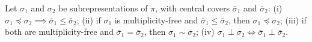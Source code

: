 Let $\sigma_1$ and $\sigma_2$ be subrepresentations of $\pi$, with central covers $\bar{\sigma}_1$ and $\bar{\sigma}_2$: (i) $\sigma_1 \preceq \sigma_2 \implies \bar{\sigma}_1 \leqslant \bar{\sigma}_2$; (ii) if $\sigma_1$ is multiplicity-free and $\bar{\sigma}_1 \leqslant \bar{\sigma}_2$, then $\sigma_1 \preceq \sigma_2$; (iii) if both are multiplicity-free and $\bar{\sigma}_1 = \bar{\sigma}_2$, then $\sigma_1 \sim \sigma_2$; (iv) $\sigma_1 \perp \sigma_2 \iff \bar{\sigma}_1 \perp \bar{\sigma}_2$.
